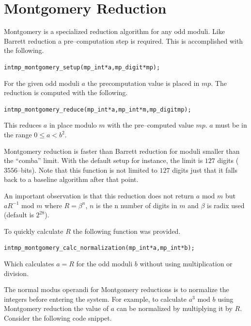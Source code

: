 \documentclass[synpaper]{book}
\begin{document}
\section{Montgomery Reduction}

Montgomery is a specialized reduction algorithm for any odd moduli.  Like Barrett reduction a pre--computation
step is required.  This is accomplished with the following.

\begin{alltt}
int mp_montgomery_setup(mp_int *a, mp_digit *mp);
\end{alltt}

For the given odd moduli $a$ the precomputation value is placed in $mp$.  The reduction is computed with the 
following.

\begin{alltt}
int mp_montgomery_reduce(mp_int *a, mp_int *m, mp_digit mp);
\end{alltt}
This reduces $a$ in place modulo $m$ with the pre--computed value $mp$.   $a$ must be in the range
$0 \le a < b^2$.

Montgomery reduction is faster than Barrett reduction for moduli smaller than the ``comba'' limit.  With the default
setup for instance, the limit is $127$ digits ($3556$--bits).   Note that this function is not limited to
$127$ digits just that it falls back to a baseline algorithm after that point.  

An important observation is that this reduction does not return $a \mbox{ mod }m$ but $aR^{-1} \mbox{ mod }m$ 
where $R = \beta^n$, $n$ is the n number of digits in $m$ and $\beta$ is radix used (default is $2^{28}$).  

To quickly calculate $R$ the following function was provided.

\begin{alltt}
int mp_montgomery_calc_normalization(mp_int *a, mp_int *b);
\end{alltt}
Which calculates $a = R$ for the odd moduli $b$ without using multiplication or division.  

The normal modus operandi for Montgomery reductions is to normalize the integers before entering the system.  For
example, to calculate $a^3 \mbox { mod }b$ using Montgomery reduction the value of $a$ can be normalized by
multiplying it by $R$.  Consider the following code snippet.
\end{document}
